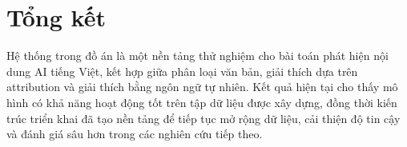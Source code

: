 \section{Tổng kết}

Hệ thống trong đồ án là một nền tảng thử nghiệm cho bài toán phát hiện nội dung AI tiếng Việt, kết hợp giữa phân loại văn bản, giải thích dựa trên attribution và giải thích bằng ngôn ngữ tự nhiên. Kết quả hiện tại cho thấy mô hình có khả năng hoạt động tốt trên tập dữ liệu được xây dựng, đồng thời kiến trúc triển khai đã tạo nền tảng để tiếp tục mở rộng dữ liệu, cải thiện độ tin cậy và đánh giá sâu hơn trong các nghiên cứu tiếp theo.
